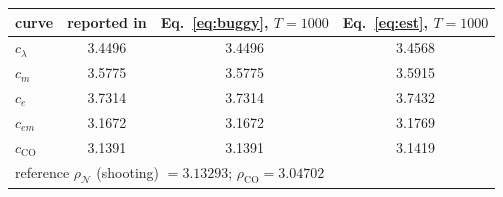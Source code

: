 \begin{tabular}{lccc}
\toprule
curve & reported in \cite{Nielsen2023} & Eq.~\eqref{eq:buggy}, $T=1000$ & Eq.~\eqref{eq:est}, $T=1000$\\
\midrule
$c_\lambda$ & 3.4496 & 3.4496 & 3.4568\\
$c_m$ & 3.5775 & 3.5775 & 3.5915\\
$c_e$ & 3.7314 & 3.7314 & 3.7432\\
$c_{em}$ & 3.1672 & 3.1672 & 3.1769\\
$c_{\mathrm{CO}}$ & 3.1391 & 3.1391 & 3.1419\\
\midrule
\multicolumn{4}{l}{reference $\rho_\mathcal{N}$ (shooting) $= 3.13293$; $\rho_{\mathrm{CO}} = 3.04702$}\\
\bottomrule
\end{tabular}